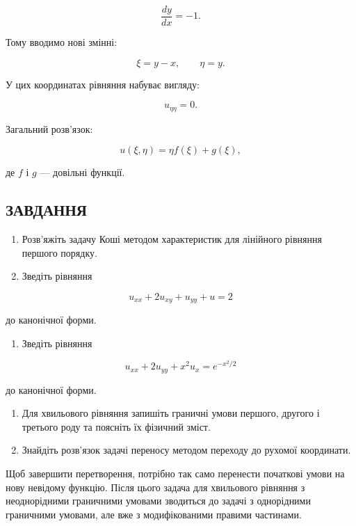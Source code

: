 \documentclass[
  ukrainian,
]{article}
\providecommand{\tightlist}{%
  \setlength{\itemsep}{0pt}\setlength{\parskip}{0pt}}
\begin{document}
\[
\frac{dy}{dx} = -1.
\]

Тому вводимо нові змінні:

\[
\xi = y - x, \qquad \eta = y.
\]

У цих координатах рівняння набуває вигляду:

\[
u_{\eta\eta} = 0.
\]

Загальний розв'язок:

\[
u(\xi,\eta) = \eta f(\xi) + g(\xi),
\]

де \(f\) і \(g\) --- довільні функції.

\subsection{ЗАВДАННЯ}\label{ux437ux430ux432ux434ux430ux43dux43dux44f-13}

\begin{enumerate}
\def\labelenumi{\arabic{enumi}.}
\item
  Розв'яжіть задачу Коші методом характеристик для лінійного рівняння
  першого порядку.
\item
  Зведіть рівняння
\end{enumerate}

\[
u_{xx} + 2u_{xy} + u_{yy} + u = 2
\]

до канонічної форми.

\begin{enumerate}
\def\labelenumi{\arabic{enumi}.}
\setcounter{enumi}{2}
\tightlist
\item
  Зведіть рівняння
\end{enumerate}

\[
u_{xx} + 2u_{yy} + x^2 u_x = e^{-x^2/2}
\]

до канонічної форми.

\begin{enumerate}
\def\labelenumi{\arabic{enumi}.}
\setcounter{enumi}{3}
\item
  Для хвильового рівняння запишіть граничні умови першого, другого і
  третього роду та поясніть їх фізичний зміст.
\item
  Знайдіть розв'язок задачі переносу методом переходу до рухомої
  координати.
\end{enumerate}

Щоб завершити перетворення, потрібно так само перенести початкові умови
на нову невідому функцію. Після цього задача для хвильового рівняння з
неоднорідними граничними умовами зводиться до задачі з однорідними
граничними умовами, але вже з модифікованими правими частинами.
\end{document}
